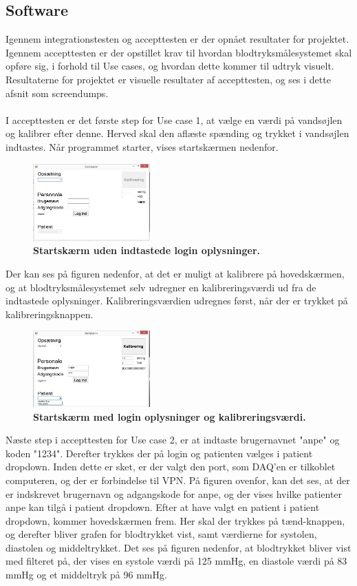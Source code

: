 \subsection{Software}
Igennem integrationstesten og accepttesten er der opnået resultater for projektet. Igennem accepttesten er der opstillet krav til hvordan blodtryksmålesystemet skal opføre sig, i forhold til Use cases, og hvordan dette kommer til udtryk visuelt. Resultaterne for projektet er visuelle resultater af accepttesten, og ses i dette afsnit som screendumps. \\\\
I accepttesten er det første step for Use case 1, at vælge en værdi på vandsøjlen og kalibrer efter denne. Herved skal den aflæste spænding og trykket i vandsøjlen indtastes. Når programmet starter, vises startskærmen nedenfor.
\begin{figure}[H]
\includegraphics[width =0.4\textwidth , center]{billeder/ITstartGUI}
\caption{\textbf{Startskærm uden indtastede login oplysninger.}}
\end{figure}
Der kan ses på figuren nedenfor, at det er muligt at kalibrere på hovedskærmen, og at blodtryksmålesystemet selv udregner en kalibreringsværdi ud fra de indtastede oplysninger. Kalibreringsværdien udregnes først, når der er trykket på kalibreringsknappen. 
\begin{figure}[H]
\includegraphics[width =0.4\textwidth , center]{billeder/ITstartGUIlogKali}
\caption{\textbf{Startskærm med login oplysninger og kalibreringsværdi.}}
\end{figure}
Næste step i accepttesten for Use case 2, er at indtaste brugernavnet "anpe" og koden "1234". Derefter trykkes der på login og patienten vælges i patient dropdown. Inden dette er sket, er der valgt den port, som DAQ’en er tilkoblet computeren, og der er forbindelse til VPN. På figuren ovenfor, kan det ses, at der er indskrevet brugernavn og adgangskode for anpe, og der vises hvilke patienter anpe kan tilgå i patient dropdown. Efter at have valgt en patient i patient dropdown, kommer hovedskærmen frem. Her skal der trykkes på tænd-knappen, og derefter bliver grafen for blodtrykket vist, samt værdierne for systolen, diastolen og middeltrykket. Det ses på figuren nedenfor, at blodtrykket bliver vist med filteret på, der vises en systole værdi på 125 mmHg, en diastole værdi på 83 mmHg og et middeltryk på 96 mmHg.
